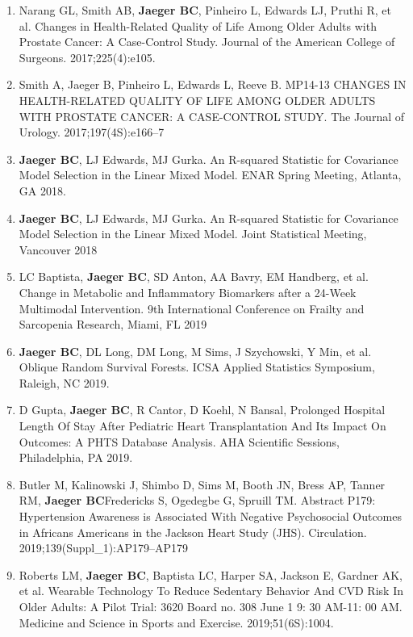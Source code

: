 \documentclass[11pt]{cv_wakeforest_article}
\newcommand{\me}{{\bfseries Jaeger BC}}
\begin{document}
\begin{enumerate}

\item Narang GL, Smith AB, \me, Pinheiro L, Edwards LJ, Pruthi R, et al. Changes in Health-Related Quality of Life Among Older Adults with Prostate Cancer: A Case-Control Study. Journal of the American College of Surgeons. 2017;225(4):e105. 


\item Smith A, Jaeger B, Pinheiro L, Edwards L, Reeve B. MP14-13 CHANGES IN HEALTH-RELATED QUALITY OF LIFE AMONG OLDER ADULTS WITH PROSTATE CANCER: A CASE-CONTROL STUDY. The Journal of Urology. 2017;197(4S):e166--7

\item \me, LJ Edwards, MJ Gurka. An R-squared Statistic for Covariance Model Selection in the Linear Mixed Model. ENAR Spring Meeting, Atlanta, GA 2018.

\item \me, LJ Edwards, MJ Gurka. An R-squared Statistic for Covariance Model Selection in the Linear Mixed Model. Joint Statistical Meeting, Vancouver 2018

\item LC Baptista, \me, SD Anton, AA Bavry, EM Handberg, et al. Change in Metabolic and Inflammatory Biomarkers after a 24-Week Multimodal Intervention. 9th International Conference on Frailty and Sarcopenia Research, Miami, FL 2019

\item \me, DL Long, DM Long, M Sims, J Szychowski, Y Min, et al. Oblique Random Survival Forests. ICSA Applied Statistics Symposium, Raleigh, NC 2019.

\item D Gupta, \me, R Cantor, D Koehl, N Bansal, Prolonged Hospital Length Of Stay After Pediatric Heart Transplantation And Its Impact On Outcomes: A PHTS Database Analysis. AHA Scientific Sessions, Philadelphia, PA 2019.

\item Butler M, Kalinowski J, Shimbo D, Sims M, Booth JN, Bress AP, Tanner RM, \me Fredericks S, Ogedegbe G, Spruill TM. Abstract P179: Hypertension Awareness is Associated With Negative Psychosocial Outcomes in Africans Americans in the Jackson Heart Study (JHS). Circulation. 2019;139(Suppl\_1):AP179--AP179

\item Roberts LM, \me, Baptista LC, Harper SA, Jackson E, Gardner AK, et al. Wearable Technology To Reduce Sedentary Behavior And CVD Risk In Older Adults: A Pilot Trial: 3620 Board no. 308 June 1 9: 30 AM-11: 00 AM. Medicine and Science in Sports and Exercise. 2019;51(6S):1004.


\end{enumerate}
\end{document}
